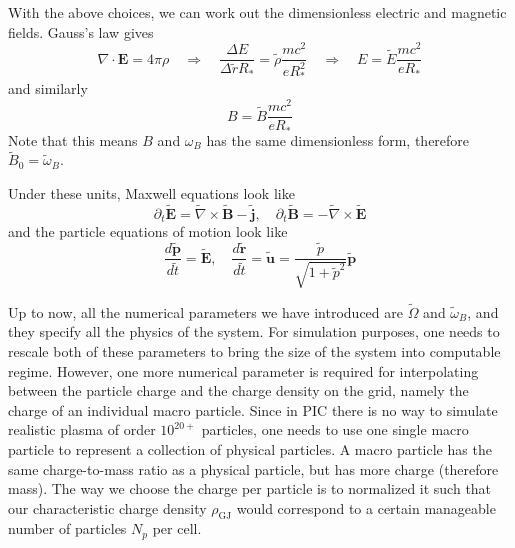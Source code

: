 With the above choices, we can work out the dimensionless electric and magnetic
fields. Gauss's law gives
\begin{equation}
  \nabla\cdot \mathbf{E} = 4\pi \rho \quad \Longrightarrow \quad \frac{\Delta E}{\Delta \tilde{r} R_{*}} = \tilde{\rho} \frac{m c^2}{e R_{*}^2} \quad \Longrightarrow \quad E = \tilde{E}\frac{m c^2}{e R_{*}}
\end{equation}
and similarly
\begin{equation}
    B = \tilde{B}\frac{m c^2}{e R_{*}}
\end{equation}
Note that this means $B$ and $\omega_B$ has the same dimensionless form,
therefore $\tilde{B}_0 = \tilde{\omega}_B$.

Under these units, Maxwell equations look like
\begin{equation}
  \partial_t \tilde{\mathbf{E}} = \tilde{\nabla}\times \tilde{\mathbf{B}} - \tilde{\mathbf{j}},\quad \partial_t \tilde{\mathbf{B}} = - \tilde{\nabla}\times \tilde{\mathbf{E}}
\end{equation}
and the particle equations of motion look like
\begin{equation}
  \frac{d \tilde{\mathbf{p}}}{d \tilde{t}} = \tilde{\mathbf{E}},\quad \frac{d \tilde{\mathbf{r}}}{d \tilde{t}} = \tilde{\mathbf{u}} = \frac{\tilde{p}}{\sqrt{1 + \tilde{p}^2}} \tilde{\mathbf{p}}
\end{equation}

Up to now, all the numerical parameters we have introduced are $\tilde{\Omega}$
and $\tilde{\omega}_B$, and they specify all the physics of the system. For
simulation purposes, one needs to rescale both of these parameters to bring the
size of the system into computable regime. However, one more numerical parameter
is required for interpolating between the particle charge and the charge density
on the grid, namely the charge of an individual macro particle. Since in PIC
there is no way to simulate realistic plasma of order $10^{20+}$ particles, one
needs to use one single macro particle to represent a collection of physical
particles. A macro particle has the same charge-to-mass ratio as a physical
particle, but has more charge (therefore mass). The way we choose the charge per
particle is to normalized it such that our characteristic charge density
$\rho_\mathrm{GJ}$ would correspond to a certain manageable number of particles $N_p$
per cell.


